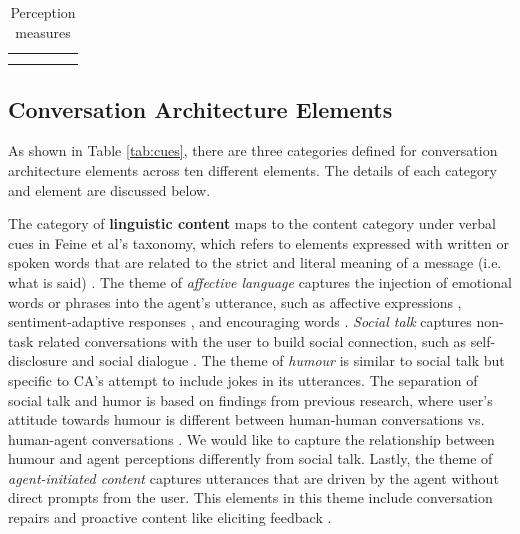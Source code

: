 \documentclass[sigconf,screen,review, anonymous]{acmart}
\newcommand{\cmt}[1]{}%
\begin{document}
\begin{table}[ht]
{\begin{tabular}{@{}p{} | p{} | p{} | >{\centering}p{} | p{} @{}}
    \cite{ouchi2019should}\cmt{[59]}\cite{volkel2021manipulating}\cmt{[68]}\cite{volkel2022user}\cmt{[75]}\cite{wester2015artificial}\cmt{[14]}\cite{zhu2022effects}\cmt{[26]} 
\\ \Xhline{1.2pt}
\end{tabular}%
}
\caption{Perception measures}
\label{tab:perceptions}
\end{table}


\subsection{Conversation Architecture Elements}

As shown in Table \ref{tab:cues}, there are three categories defined for conversation architecture elements across ten different elements. The details of each category and element are discussed below.

The category of \textbf{linguistic content} maps to the content category under verbal cues in Feine et al's taxonomy, which refers to elements expressed with written or spoken words that are related to the strict and literal meaning of a message (i.e. what is said) \cite{feine2019taxonomy}. The theme of \textit{affective language} captures the injection of emotional words or phrases into the agent's utterance, such as affective expressions \cite{seeger2021chatbots}\cmt{[35]}\cite{yang2017perceived}\cmt{[44]}\cite{zhu2022effects}\cmt{[26]}, sentiment-adaptive responses \cite{diederich2019emulating}\cmt{[25]}, and encouraging words \cite{healey2013relating}\cmt{[39]}. \textit{Social talk} captures non-task related conversations with the user to build social connection, such as self-disclosure \cite{lee2020hear}\cmt{[23]} and social dialogue \cite{volkel2021manipulating}\cmt{[68]}\cite{lubold2016effects}\cmt{[86]}. The theme of \textit{humour} is similar to social talk but specific to CA's attempt to include jokes in its utterances. The separation of social talk and humor is based on findings from previous research, where user's attitude towards humour is different between human-human conversations vs. human-agent conversations \cite{clark2019makes}. We would like to capture the relationship between humour and agent perceptions differently from social talk. Lastly, the theme of \textit{agent-initiated content} captures utterances that are driven by the agent without direct prompts from the user. This elements in this theme include conversation repairs \cite{cuadra2021my}\cmt{[67]}\cite{ashktorab2019resilient}\cmt{[88]} and proactive content like eliciting feedback \cite{xiao2021let}\cmt{[73]}.
\end{document}
